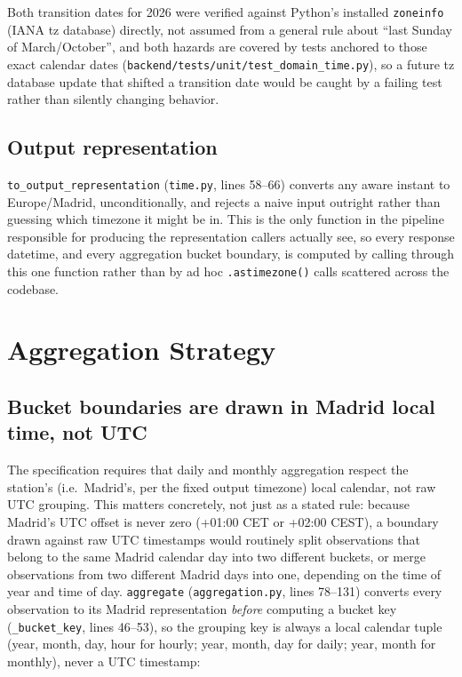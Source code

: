 \documentclass[11pt,a4paper]{article}
\begin{document}
Both transition dates for 2026 were verified against Python's installed
\texttt{zoneinfo} (IANA tz database) directly, not assumed from a general
rule about ``last Sunday of March/October'', and both hazards are covered
by tests anchored to those exact calendar dates
(\texttt{backend/tests/unit/test\_domain\_time.py}), so a future tz
database update that shifted a transition date would be caught by a
failing test rather than silently changing behavior.

\subsection{Output representation}

\texttt{to\_output\_representation} (\texttt{time.py}, lines 58--66)
converts any aware instant to Europe/Madrid, unconditionally, and rejects a
naive input outright rather than guessing which timezone it might be in.
This is the only function in the pipeline responsible for producing the
representation callers actually see, so every response datetime, and every
aggregation bucket boundary, is computed by calling through this one
function rather than by ad hoc \texttt{.astimezone()} calls scattered
across the codebase.

\section{Aggregation Strategy}
\label{sec:aggregation}

\subsection{Bucket boundaries are drawn in Madrid local time, not UTC}

The specification requires that daily and monthly aggregation respect the
station's (i.e.\ Madrid's, per the fixed output timezone) local calendar,
not raw UTC grouping. This matters concretely, not just as a stated rule:
because Madrid's UTC offset is never zero (+01:00 CET or +02:00 CEST), a
boundary drawn against raw UTC timestamps would routinely split
observations that belong to the same Madrid calendar day into two
different buckets, or merge observations from two different Madrid days
into one, depending on the time of year and time of day. \texttt{aggregate}
(\texttt{aggregation.py}, lines 78--131) converts every observation to its
Madrid representation \emph{before} computing a bucket key
(\texttt{\_bucket\_key}, lines 46--53), so the grouping key is always a
local calendar tuple (year, month, day, hour for hourly; year, month, day
for daily; year, month for monthly), never a UTC timestamp:
\end{document}
